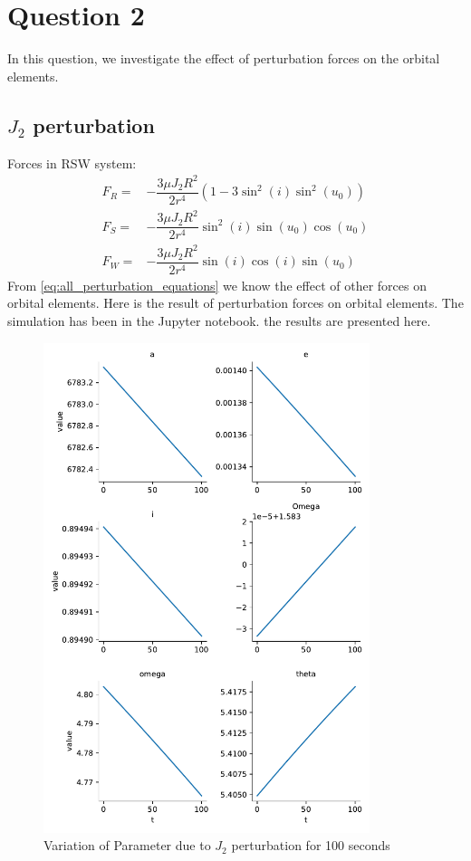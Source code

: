 \section{Question 2}
In this question, we investigate the effect of perturbation forces on the orbital elements.
\subsection{$J_2$ perturbation}

Forces in RSW system:
\begin{equation}
    \begin{aligned}
        F_R = & -\dfrac{3\mu J_2 R^2}{2r^4}\left(1-3\sin^2(i)\sin^2(u_0)\right)\\
        F_S = & -\dfrac{3\mu J_2 R^2}{2r^4}\sin^2(i)\sin(u_0)\cos(u_0)\\
        F_W = & -\dfrac{3\mu J_2 R^2}{2r^4}\sin(i)\cos(i)\sin(u_0)
    \end{aligned}
\end{equation}
From \eqref{eq:all_perturbation_equations} we know the effect of other forces on orbital elements. Here is the result of perturbation forces on orbital elements.
The simulation has been in the Jupyter notebook. the results are presented here.
\begin{figure}[H]
    \centering
    \includegraphics[width=0.85\textwidth]{../Figure/Q2/orbital_elements_100.pdf}
    \caption{Variation of Parameter due to $J_2$ perturbation for 100 seconds}
\end{figure}

